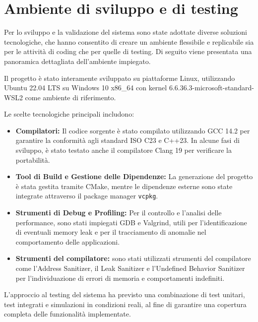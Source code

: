 \documentclass[12pt]{article}
\begin{document}
\section{Ambiente di sviluppo e di testing} {


Per lo sviluppo e la validazione del sistema sono state adottate diverse soluzioni tecnologiche, che hanno consentito di creare un ambiente flessibile e replicabile sia per le attività di coding che per quelle di testing. Di seguito viene presentata una panoramica dettagliata dell'ambiente impiegato.

Il progetto è stato interamente sviluppato su piattaforme Linux, utilizzando Ubuntu 22.04 LTS su Windows 10 x86\_64 con kernel 6.6.36.3-microsoft-standard-WSL2 come ambiente di riferimento.

Le scelte tecnologiche principali includono:

\begin{itemize}
    \item \textbf{Compilatori:} Il codice sorgente è stato compilato utilizzando GCC 14.2 per garantire la conformità agli standard ISO C23 e C++23. In alcune fasi di sviluppo, è stato testato anche il compilatore Clang 19 per verificare la portabilità.
    \item \textbf{Tool di Build e Gestione delle Dipendenze:} La generazione del progetto è stata gestita tramite CMake, mentre le dipendenze esterne sono state integrate attraverso il package manager \texttt{vcpkg}.
    \item \textbf{Strumenti di Debug e Profiling:} Per il controllo e l'analisi delle performance, sono stati impiegati GDB e Valgrind, utili per l'identificazione di eventuali memory leak e per il tracciamento di anomalie nel comportamento delle applicazioni.
    \item \textbf{Strumenti del compilatore:} sono stati utilizzati strumenti del compilatore come l'Address Sanitizer, il Leak Sanitizer e l'Undefined Behavior Sanitizer per l'individuazione di errori di memoria e comportamenti indefiniti.
\end{itemize}

L'approccio al testing del sistema ha previsto una combinazione di test unitari, test integrati e simulazioni in condizioni reali, al fine di garantire una copertura completa delle funzionalità implementate.

}
\end{document}
